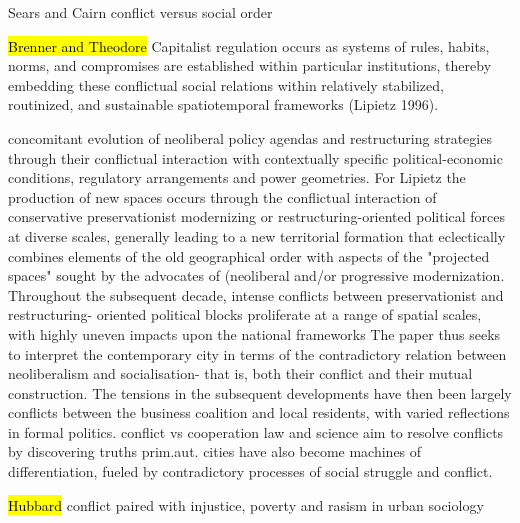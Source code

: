 \documentclass[11pt]{report}
\begin{document}
Sears and Cairn
conflict versus social order

\hl{Brenner and Theodore}
Capitalist regulation occurs as systems of rules, habits, norms, and compromises are established within particular institutions, thereby embedding these conflictual social relations within relatively stabilized, routinized, and sustainable spatiotemporal frameworks (Lipietz 1996). 

concomitant evolution of neoliberal policy agendas and restructuring strategies through their conflictual interaction with contextually specific political-economic conditions, regulatory arrangements and power geometries. For Lipietz the production of new spaces occurs through the conflictual interaction of conservative preservationist modernizing or restructuring-oriented political forces at diverse scales, generally leading 
to a new territorial formation that eclectically combines elements of the old geographical order with aspects of the "projected spaces" sought by the advocates of (neoliberal and/or progressive modernization. 
Throughout the subsequent decade, intense conflicts between preservationist and restructuring- oriented political blocks proliferate at a range of spatial scales, with highly uneven impacts upon the national frameworks  
The paper thus seeks to interpret the contemporary city in terms of the contradictory relation between neoliberalism and socialisation- that is, both their conflict and their mutual construction.
The tensions in the subsequent developments have then been largely conflicts between the business coalition and local residents, with varied reflections in formal politics.
conflict vs cooperation
law and science aim to resolve conflicts by discovering truths prim.aut.
cities have also become machines of differentiation, 
fueled by contradictory processes of social struggle and conflict. 

\hl{Hubbard}
conflict paired with injustice, poverty and rasism in urban sociology
\end{document}
